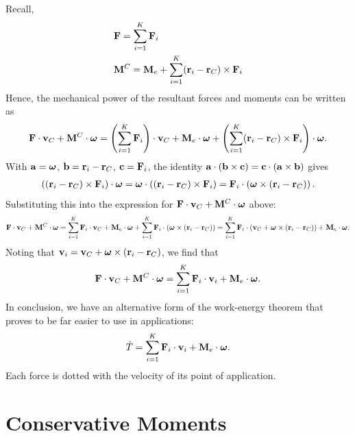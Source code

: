 \documentclass[
  letterpaper,
  DIV=11,
  numbers=noendperiod]{scrreprt}
\newcommand{\lp}{\left(}
\newcommand{\rp}{\right)}
\newcommand{\bomega}{\boldsymbol{\omega}}
\begin{document}
Recall, \begin{align}
    \begin{split}
        & {\bf F} = \sum_{i=1}^K{\bf F}_i\\
        & {\bf M}^C = {\bf M}_e+\sum_{i=1}^K({\bf r}_i-{\bf r}_C)\times{\bf F}_i
    \end{split}
\end{align} Hence, the mechanical power of the resultant forces and
moments can be written as \begin{align}
    {\bf F}\cdot{\bf v}_C+{\bf M}^C\cdot\bomega = \lp\sum_{i=1}^K{\bf F}_i\rp\cdot{\bf v}_C+{\bf M}_e\cdot\bomega+\lp\sum_{i=1}^K({\bf r}_i-{\bf r}_C)\times{\bf F}_i\rp\cdot\bomega.
\end{align} With \({\bf a}=\bomega\), \({\bf b}={\bf r}_i-{\bf r}_C\),
\({\bf c}={\bf F}_i\), the identity
\({\bf a}\cdot({\bf b}\times{\bf c}) = {\bf c}\cdot({\bf a}\times{\bf b})\)
gives \begin{align}
    \lp({\bf r}_i-{\bf r}_C)\times{\bf F}_i\rp\cdot\bomega = \bomega\cdot\lp({\bf r}_i-{\bf r}_C)\times{\bf F}_i\rp = {\bf F}_i\cdot\lp\bomega\times({\bf r}_i-{\bf r}_C)\rp.
\end{align} Substituting this into the expression for
\({\bf F}\cdot{\bf v}_C+{\bf M}^C\cdot\bomega\) above: \begin{align}
    {\bf F}\cdot{\bf v}_C+{\bf M}^C\cdot\bomega = \sum_{i=1}^K{\bf F}_i\cdot{\bf v}_C+{\bf M}_e\cdot\bomega+\sum_{i=1}^K{\bf F}_i\cdot\lp\bomega\times({\bf r}_i-{\bf r}_C)\rp = \sum_{i=1}^K{\bf F}_i\cdot\lp{\bf v}_C+\bomega\times({\bf r}_i-{\bf r}_C)\rp+{\bf M}_e\cdot\bomega.
\end{align} Noting that
\({\bf v}_i = {\bf v}_C+\bomega\times({\bf r}_i-{\bf r}_C)\), we find
that \begin{align}
    {\bf F}\cdot{\bf v}_C+{\bf M}^C\cdot\bomega = \sum_{i=1}^K{\bf F}_i\cdot{\bf v}_i+{\bf M}_e\cdot\bomega.
\end{align} In conclusion, we have an alternative form of the
work-energy theorem that proves to be far easier to use in applications:
\begin{align}
    \dot{T} = \sum_{i=1}^K{\bf F}_i\cdot{\bf v}_i+{\bf M}_e\cdot\bomega.
\end{align} Each force is dotted with the velocity of its point of
application.

\section{Conservative Moments}\label{conservative-moments}
\end{document}
